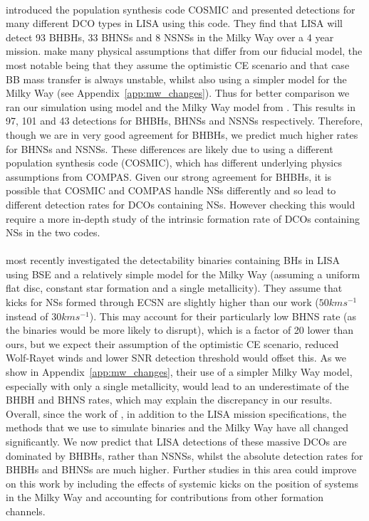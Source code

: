 \paragraph{\citet{Breivik+2020}} introduced the population synthesis code COSMIC and presented detections for many different DCO types in LISA using this code. They find that LISA will detect 93 BHBHs, 33 BHNSs and 8 NSNSs in the Milky Way over a 4 year mission. \citet{Breivik+2020} make many physical assumptions that differ from our fiducial model, the most notable being that they assume the optimistic CE scenario and that case BB mass transfer is always unstable, whilst also using a simpler model for the Milky Way (see Appendix~\ref{app:mw_changes}). Thus for better comparison we ran our simulation using model \modCaseBBOpt{} and the Milky Way model from \citet{Breivik+2020}. This results in 97, 101 and 43 detections for BHBHs, BHNSs and NSNSs respectively. Therefore, though we are in very good agreement for BHBHs, we predict much higher rates for BHNSs and NSNSs. These differences are likely due to using a different population synthesis code (COSMIC), which has different underlying physics assumptions from COMPAS. Given our strong agreement for BHBHs, it is possible that COSMIC and COMPAS handle NSs differently and so lead to different detection rates for DCOs containing NSs. However checking this would require a more in-depth study of the intrinsic formation rate of DCOs containing NSs in the two codes.

\paragraph{\citet{Shao+2021}} most recently investigated the detectability binaries containing BHs in LISA using BSE and a relatively simple model for the Milky Way (assuming a uniform flat disc, constant star formation and a single metallicity). They assume that kicks for NSs formed through ECSN are slightly higher than our work ($50 \unit{km}{s^{-1}}$ instead of $30 \unit{km}{s^{-1}}$). This may account for their particularly low BHNS rate (as the binaries would be more likely to disrupt), which is a factor of 20 lower than ours, but we expect their assumption of the optimistic CE scenario, reduced Wolf-Rayet winds and lower SNR detection threshold would offset this. As we show in Appendix~\ref{app:mw_changes}, their use of a simpler Milky Way model, especially with only a single metallicity, would lead to an underestimate of the BHBH and BHNS rates, which may explain the discrepancy in our results.\\

\noindent{}Overall, since the work of \citet{Nelemans+2001}, in addition to the LISA mission specifications, the methods that we use to simulate binaries and the Milky Way have all changed significantly. We now predict that LISA detections of these massive DCOs are dominated by BHBHs, rather than NSNSs, whilst the absolute detection rates for BHBHs and BHNSs are much higher. Further studies in this area could improve on this work by including the effects of systemic kicks on the position of systems in the Milky Way and accounting for contributions from other formation channels.
